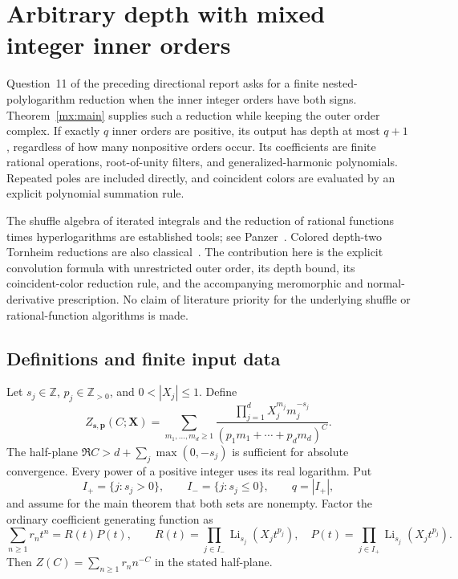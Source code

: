 \providecommand{\mxLi}{\operatorname{Li}}

\section{Arbitrary depth with mixed integer inner orders}
\label{mx:section}

Question~11 of the preceding directional report asks for a finite
nested-polylogarithm reduction when the inner integer orders have both
signs.  Theorem~\ref{mx:main} supplies such a reduction while keeping the
outer order complex.  If exactly $q$ inner orders are positive, its
output has depth at most $q+1$, regardless of how many nonpositive
orders occur.  Its coefficients are finite rational operations,
root-of-unity filters, and generalized-harmonic polynomials.  Repeated
poles are included directly, and coincident colors are evaluated by an
explicit polynomial summation rule.

The shuffle algebra of iterated integrals and the reduction of rational
functions times hyperlogarithms are established tools; see
Panzer~\cite[Sections~2.1--2.3]{mx:Panzer}.  Colored depth-two Tornheim
reductions are also classical~\cite{mx:Zhao}.  The contribution here is
the explicit convolution formula with unrestricted outer order, its
depth bound, its coincident-color reduction rule, and the accompanying
meromorphic and normal-derivative prescription.  No claim of literature
priority for the underlying shuffle or rational-function algorithms is
made.

\subsection{Definitions and finite input data}

Let $s_j\in\mathbb Z$, $p_j\in\mathbb Z_{>0}$, and
$0<|X_j|\leq1$.  Define
\begin{equation}\label{mx:Z}
 Z_{\mathbf s,\mathbf p}(C;\mathbf X)
 =\sum_{m_1,\ldots,m_d\geq1}
  \frac{\prod_{j=1}^dX_j^{m_j}m_j^{-s_j}}
       {(p_1m_1+\cdots+p_dm_d)^C}.
\end{equation}
The half-plane
$\Re C>d+\sum_j\max(0,-s_j)$ is sufficient for absolute
convergence.  Every power of a positive integer uses its real
logarithm.  Put
\[
 I_+=\{j:s_j>0\},\qquad I_-=\{j:s_j\leq0\},\qquad
 q=|I_+|,
\]
and assume for the main theorem that both sets are nonempty.  Factor
the ordinary coefficient generating function as
\begin{equation}\label{mx:factor}
 \sum_{n\geq1}r_nt^n=R(t)P(t),\qquad
 R(t)=\prod_{j\in I_-}\mxLi_{s_j}(X_jt^{p_j}),\quad
 P(t)=\prod_{j\in I_+}\mxLi_{s_j}(X_jt^{p_j}).
\end{equation}
Then $Z(C)=\sum_{n\geq1}r_nn^{-C}$ in the stated half-plane.

